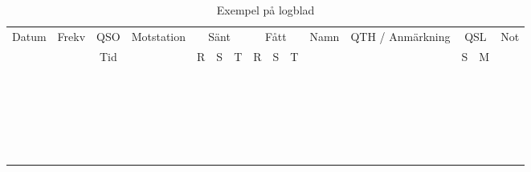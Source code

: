 \setlongtables
\begin{longtable}{|c|c|c|c|c|c|c|c|c|c|c|c|c|c|c|}
\caption{Exempel på logblad} \\ \hline
Datum & Frekv & QSO & Motstation & \multicolumn{3}{c}{Sänt} & \multicolumn{3}{c}{Fått} & Namn & QTH / Anmärkning & \multicolumn{2}{c}{QSL} & Not \\
      &       & Tid &            & R & S & T                & R & S & T                &      &                  & S & M                   & \\ \hline \hline
 & & & & & & & & & & & & & & \\ \hline
 & & & & & & & & & & & & & & \\ \hline
 & & & & & & & & & & & & & & \\ \hline
 & & & & & & & & & & & & & & \\ \hline
 & & & & & & & & & & & & & & \\ \hline
 & & & & & & & & & & & & & & \\ \hline
 & & & & & & & & & & & & & & \\ \hline
 & & & & & & & & & & & & & & \\ \hline
 & & & & & & & & & & & & & & \\ \hline
 & & & & & & & & & & & & & & \\ \hline
 & & & & & & & & & & & & & & \\ \hline
 & & & & & & & & & & & & & & \\ \hline
 & & & & & & & & & & & & & & \\ \hline
 & & & & & & & & & & & & & & \\ \hline
 & & & & & & & & & & & & & & \\ \hline
 & & & & & & & & & & & & & & \\ \hline
 & & & & & & & & & & & & & & \\ \hline
 & & & & & & & & & & & & & & \\ \hline
 & & & & & & & & & & & & & & \\ \hline
 & & & & & & & & & & & & & & \\ \hline
 & & & & & & & & & & & & & & \\ \hline
 & & & & & & & & & & & & & & \\ \hline
 & & & & & & & & & & & & & & \\ \hline
\end{longtable}

